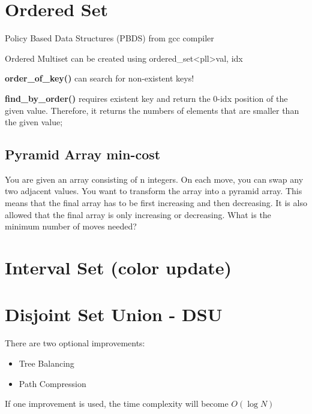 \section{Ordered Set}

    Policy Based Data Structures (PBDS) from gcc compiler

    Ordered Multiset can be created using ordered\_set\textless pll\textgreater {val, idx}

    \textbf{order\_of\_key()} can search for non-existent keys!
    
    \textbf{find\_by\_order()} requires existent key and return the 0-idx position of the given value.
    Therefore, it returns the numbers of elements that are smaller than the given value;


    \subsection{Pyramid Array min-cost}

    You are given an array consisting of n integers. On each move, you can swap any two adjacent values.
    You want to transform the array into a pyramid array. This means that the final array has to be first increasing and then decreasing. 
    It is also allowed that the final array is only increasing or decreasing.
    What is the minimum number of moves needed?


\section{Interval Set (color update)}


\section{Disjoint Set Union - DSU}

    There are two optional improvements:

    \begin{itemize}
        \item Tree Balancing 
        \item Path Compression
    \end{itemize}

    If one improvement is used, 
    the time complexity will become $O(\log{N})$

